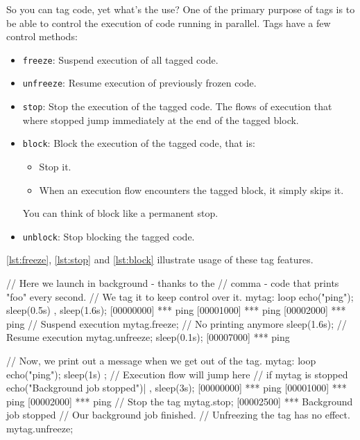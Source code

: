 \documentclass[openright,twoside,12pt]{report}
\newcommand{\lst}[1]{\autoref{lst:#1}}
\begin{document}
So you can tag code, yet what's the use? One of the primary purpose of
tags is to be able to control the execution of code running in
parallel. Tags have a few control methods:

\begin{itemize}
\item \texttt{freeze}: Suspend execution of all tagged code.
\item \texttt{unfreeze}: Resume execution of previously frozen code.
\item \texttt{stop}: Stop the execution of the tagged code. The flows
  of execution that where stopped jump immediately at the end of the
  tagged block.
\item \texttt{block}: Block the execution of the tagged code, that is:
  \begin{itemize}
  \item Stop it.
  \item When an execution flow encounters the tagged block, it simply
    skips it.
  \end{itemize}
  You can think of block like a permanent stop.
\item \texttt{unblock}: Stop blocking the tagged code.
\end{itemize}

\autoref{lst:freeze}, \lst{stop} and \lst{block} illustrate usage of these tag
features.

\begin{urbiscript}[caption=Freezing/unfreezing code execution, label=lst:freeze]
// Here we launch in background - thanks to the
// comma - code that prints "foo" every second.
// We tag it to keep control over it.
mytag:
{
  loop
  {
    echo("ping");
    sleep(0.5s)
  }
},
sleep(1.6s);
[00000000] *** ping
[00001000] *** ping
[00002000] *** ping
// Suspend execution
mytag.freeze;
// No printing anymore
sleep(1.6s);
// Resume execution
mytag.unfreeze;
sleep(0.1s);
[00007000] *** ping
\end{urbiscript}

\begin{urbiscript}[caption=Stopping code execution, label=lst:stop]
// Now, we print out a message when we get out of the tag.
{
  mytag:
  {
    loop
    {
      echo("ping"); sleep(1s)
    }
  };
  // Execution flow will jump here
  // if mytag is stopped
  echo("Background job stopped")|
},
sleep(3s);
[00000000] *** ping
[00001000] *** ping
[00002000] *** ping
// Stop the tag
mytag.stop;
[00002500] *** Background job stopped
// Our background job finished.
// Unfreezing the tag has no effect.
mytag.unfreeze;
\end{urbiscript}
\end{document}
